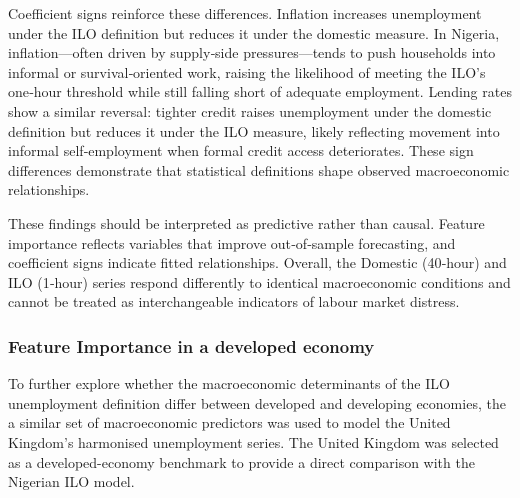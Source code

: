 \documentclass[
  letterpaper,
  DIV=11,
  numbers=noendperiod]{scrartcl}
\begin{document}
Coefficient signs reinforce these differences. Inflation increases
unemployment under the ILO definition but reduces it under the domestic
measure. In Nigeria, inflation---often driven by supply‑side
pressures---tends to push households into informal or survival‑oriented
work, raising the likelihood of meeting the ILO's one‑hour threshold
while still falling short of adequate employment. Lending rates show a
similar reversal: tighter credit raises unemployment under the domestic
definition but reduces it under the ILO measure, likely reflecting
movement into informal self‑employment when formal credit access
deteriorates. These sign differences demonstrate that statistical
definitions shape observed macroeconomic relationships.

These findings should be interpreted as predictive rather than causal.
Feature importance reflects variables that improve out‑of‑sample
forecasting, and coefficient signs indicate fitted relationships.
Overall, the Domestic (40‑hour) and ILO (1‑hour) series respond
differently to identical macroeconomic conditions and cannot be treated
as interchangeable indicators of labour market distress.

\subsubsection{Feature Importance in a developed
economy}\label{feature-importance-in-a-developed-economy}

To further explore whether the macroeconomic determinants of the ILO
unemployment definition differ between developed and developing
economies, the a similar set of macroeconomic predictors was used to
model the United Kingdom's harmonised unemployment series. The United
Kingdom was selected as a developed-economy benchmark to provide a
direct comparison with the Nigerian ILO model.
\end{document}
